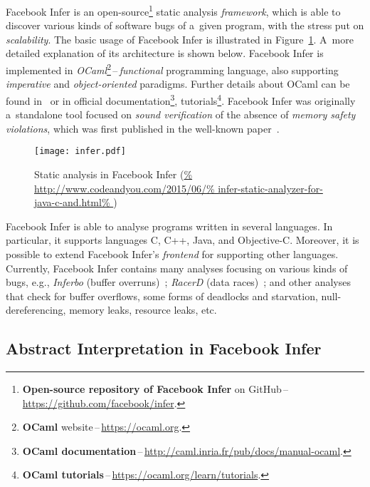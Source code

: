 Facebook Infer is an open-source\footnote{\textbf{Open-source repository of
Facebook Infer} on GitHub\,--\,\url{https://github.com/facebook/infer}.}
static analysis \emph{framework}, which is able to discover various kinds of
software bugs of a~given program, with the stress put on \emph{scalability}.
The basic usage of Facebook Infer is illustrated in Figure~\ref{fig:infer}.
A~more detailed explanation of its architecture is shown below. Facebook
Infer is implemented in \emph{OCaml}\footnote{\textbf{OCaml}
website\,--\,\url{https://ocaml.org}.}\,--\,\emph{functional} programming
language, also supporting \emph{imperative} and \emph{object-oriented}
paradigms. Further details about OCaml can be found in~\cite{realWorldOCaml}
or in official documentation\footnote{\textbf{OCaml
documentation}\,--\,\url{http://caml.inria.fr/pub/docs/manual-ocaml}.},
tutorials\footnote{\textbf{OCaml
tutorials}\,--\,\url{https://ocaml.org/learn/tutorials}.}. Facebook Infer was
originally a~standalone tool focused on \emph{sound verification} of the
absence of \emph{memory safety violations}, which was first published in
the well-known paper~\cite{inferBiabduction}.

\begin{figure}[hbt]
    \centering
    \texttt{[image: infer.pdf]}
    \caption{%
        Static analysis in Facebook Infer
        (\url{%
            http://www.codeandyou.com/2015/06/%
            infer-static-analyzer-for-java-c-and.html%
        })
    }
    \label{fig:infer}
\end{figure}

Facebook Infer is able to analyse programs written in several languages.
In particular, it supports languages C, C++, Java, and Objective-C. Moreover,
it is possible to extend Facebook Infer's \emph{frontend} for supporting
other languages. Currently, Facebook Infer contains many analyses focusing
on various kinds of bugs, e.g., \emph{Inferbo} (buffer
overruns)~\cite{inferboOnline}; \emph{RacerD} (data races)~\cite{racerD,
racerDOnline, staticRaceDetectorTruePositive}; and other analyses
that check for buffer overflows, some forms of deadlocks and starvation,
null-dereferencing, memory leaks, resource leaks, etc.


\subsection{Abstract Interpretation in Facebook Infer}
\label{sec:fbinferAI}

